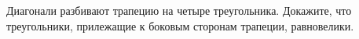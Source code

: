 \begin{ex}
	\begin{condition}
		Диагонали разбивают трапецию на четыре треугольника. Докажите, что треугольники, прилежащие к боковым сторонам трапеции, равновелики.
	\end{condition}
\end{ex}
